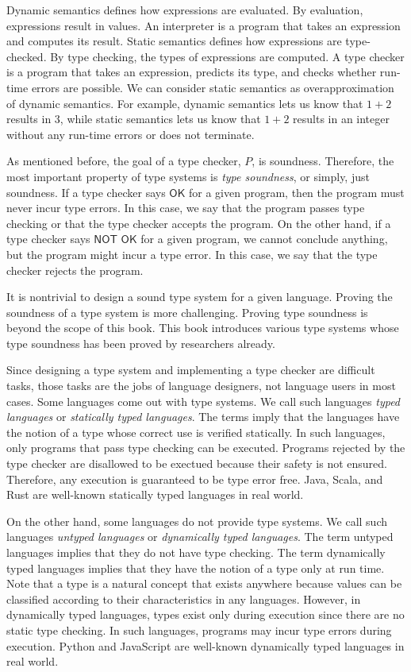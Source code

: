 Dynamic semantics defines how expressions are evaluated. By evaluation,
expressions result in values. An interpreter is a program that takes an
expression and computes its result. Static semantics defines how expressions are
type-checked. By type checking, the types of expressions are computed. A type
checker is a program that takes an expression, predicts its type, and checks
whether run-time errors are possible. We can consider static semantics as
overapproximation of dynamic semantics. For example, dynamic semantics lets us
know that $1+2$ results in $3$, while static semantics lets us know that $1+2$
results in an integer without any run-time errors or does not terminate.

As mentioned before, the goal of a type checker, $P$, is soundness. Therefore,
the most important property of type systems is \textit{type soundness}, or simply, just soundness. If a type checker says $\textsf{OK}$ for
a given program, then the program must never incur type errors. In this
case, we say that the program passes type checking or that the type checker accepts
the program. On the other hand, if a type checker says $\textsf{NOT OK}$ for a
given program, we cannot conclude anything, but the program might incur a type
error. In this case, we say that the type checker rejects the program.

It is nontrivial to design a sound type system for a given language. Proving the
soundness of a type system is more challenging. Proving type soundness is
beyond the scope of this book. This book introduces various type systems whose
type soundness has been proved by researchers already.

Since designing a type system and implementing a type checker are
difficult tasks, those tasks are the jobs of language designers, not language
users in most cases. Some languages come out with type systems. We call such languages
\textit{typed languages} or \textit{statically typed
languages}. The terms imply that the languages
have the notion of a type whose correct use is verified statically.
In such languages, only programs
that pass type checking can be executed. Programs rejected by the type checker
are disallowed to be exectued because their safety is not ensured. Therefore,
any execution is guaranteed to be type error free. Java, Scala,
and Rust are well-known statically typed languages in real world.

On the other hand, some languages do not provide type systems. We call such
languages \textit{untyped languages} or
\textit{dynamically typed languages}.
The term untyped languages implies that they do not have type checking.
The term dynamically typed languages implies that they have the notion of a type
only at run time. Note that a type is a natural concept that exists anywhere
because values can be classified according to their characteristics in any
languages. However, in dynamically typed languages, types exist only during execution since there are no static
type checking. In such languages, programs may incur type errors during execution.
Python and JavaScript are well-known dynamically typed languages in real world.

